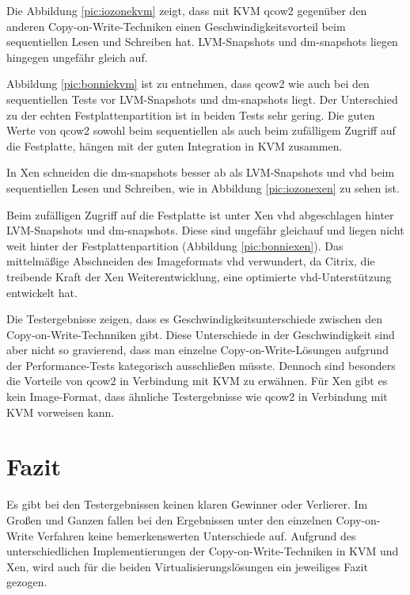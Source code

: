Die Abbildung \ref{pic:iozonekvm} zeigt, dass mit KVM qcow2 gegenüber den anderen Copy-on-Write-Techniken einen Geschwindigkeitsvorteil beim sequentiellen Lesen und Schreiben hat. LVM-Snapshots und dm-snapshots liegen hingegen ungefähr gleich auf.

Abbildung \ref{pic:bonniekvm} ist zu entnehmen, dass qcow2 wie auch bei den sequentiellen Tests vor LVM-Snapshots und dm-snapshots liegt. Der Unterschied zu der echten Festplattenpartition ist in beiden Tests sehr gering. Die guten Werte von qcow2 sowohl beim sequentiellen als auch beim zufälligem Zugriff auf die Festplatte, hängen mit der guten Integration in KVM zusammen.

In Xen schneiden die dm-snapshots besser ab als LVM-Snapshots und vhd beim sequentiellen Lesen und Schreiben, wie in Abbildung \ref{pic:iozonexen} zu sehen ist. 

Beim zufälligen Zugriff auf die Festplatte ist unter Xen vhd abgeschlagen hinter LVM-Snapshots und dm-snapshots. Diese sind ungefähr gleichauf und liegen nicht weit hinter der Festplattenpartition (Abbildung \ref{pic:bonniexen}). Das mittelmäßige Abschneiden des Imageformats vhd verwundert, da Citrix, die treibende Kraft der Xen Weiterentwicklung, eine optimierte vhd-Unterstützung entwickelt hat. \cite{citrixvhd}

Die Testergebnisse zeigen, dass es Geschwindigkeitsunterschiede zwischen den Copy-on-Write-Technniken gibt. Diese Unterschiede in der Geschwindigkeit sind aber nicht so gravierend, dass man einzelne Copy-on-Write-Lösungen aufgrund der Performance-Tests kategorisch ausschließen müsste. Dennoch sind besonders die Vorteile von qcow2 in Verbindung mit KVM zu erwähnen. Für Xen gibt es kein Image-Format, dass ähnliche Testergebnisse wie qcow2 in Verbindung mit KVM vorweisen kann. 

\section{Fazit}
Es gibt bei den Testergebnissen keinen klaren Gewinner oder Verlierer. Im Großen und Ganzen fallen bei den Ergebnissen unter den einzelnen Copy-on-Write Verfahren keine bemerkenswerten Unterschiede auf. Aufgrund des unterschiedlichen Implementierungen der Copy-on-Write-Techniken in KVM und Xen, wird auch für die beiden Virtualisierungslösungen ein jeweiliges Fazit gezogen.

